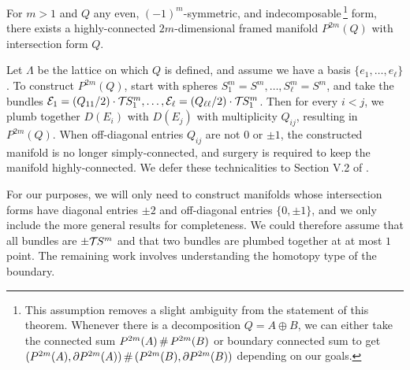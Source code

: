 \begin{proposition}\label{thm:plumbing-existence-theorem}
	For $m>1$ and $Q$ any even, $(-1)^m$-symmetric, and indecomposable\,\footnote{This assumption removes a slight ambiguity from the statement of this theorem. Whenever there is a decomposition $Q=A\oplus B$, we can either take the connected sum $P^{2m}(A)\+P^{2m}(B)$ or boundary connected sum to get $(P^{2m}(A),\partial P^{2m}(A))\+ (P^{2m}(B),\partial P^{2m}(B))$ depending on our goals.} form, there exists a highly-connected $2m$-dimensional framed manifold $P^{2m}(Q)$ with intersection form $Q$.
\end{proposition}

Let $\Lambda$ be the lattice on which $Q$ is defined, and assume we have a basis $\{e_1,\ldots, e_\ell\}$. To construct $P^{2m}(Q)$, start with spheres $S_1^m=S^m,\ldots, S_\ell^m=S^m$, and take the bundles $\mathcal{E}_1=(Q_{11}/2)\cdot {\mathcal{T}\hspace{-0.1em}} S^m_1,\ldots, \mathcal{E}_\ell=(Q_{\ell\ell}/2)\cdot {\mathcal{T}\hspace{-0.1em}} S^m_1$. Then for every $i<j$, we plumb together $D(E_i)$ with $D(E_j)$ with multiplicity $Q_{ij}$, resulting in $P^{2m}(Q)$. When off-diagonal entries $Q_{ij}$ are not $0$ or $\pm 1$, the constructed manifold is no longer simply-connected, and surgery is required to keep the manifold highly-connected. We defer these technicalities to Section V.2 of \cite{browder1972surgery}.

For our purposes, we will only need to construct manifolds whose intersection forms have diagonal entries $\pm 2$ and off-diagonal entries $\{0,\pm 1\}$, and we only include the more general results for completeness. We could therefore assume that all bundles are $\pm {\mathcal{T}\hspace{-0.1em}} S^m$ and that two bundles are plumbed together at at most $1$ point.
%
%
The remaining work involves understanding the homotopy type of the boundary. 

